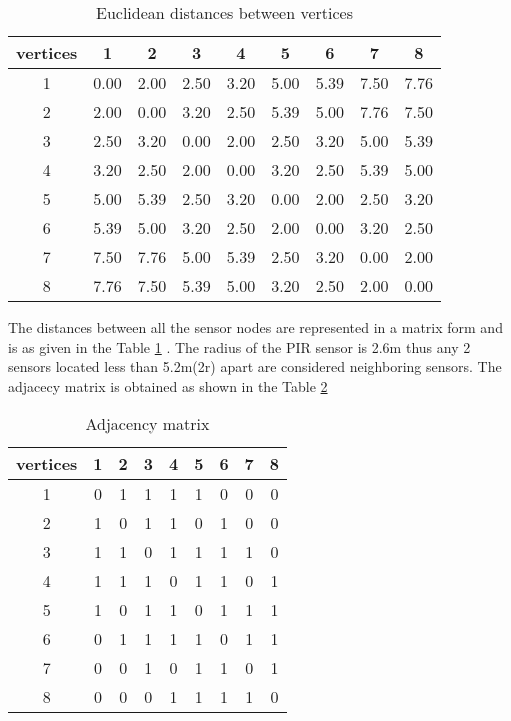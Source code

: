 \begin{table}[]
\centering
\caption{Euclidean distances between vertices}
\label{tab:dist}
\begin{tabular}{|c|c|c|c|c|c|c|c|c|}
\hline
vertices & 1    & 2    & 3    & 4    & 5    & 6    & 7    & 8    \\ \hline
1        & 0.00 & 2.00 & 2.50 & 3.20 & 5.00 & 5.39 & 7.50 & 7.76 \\ \hline
2        & 2.00 & 0.00 & 3.20 & 2.50 & 5.39 & 5.00 & 7.76 & 7.50 \\ \hline
3        & 2.50 & 3.20 & 0.00 & 2.00 & 2.50 & 3.20 & 5.00 & 5.39 \\ \hline
4        & 3.20 & 2.50 & 2.00 & 0.00 & 3.20 & 2.50 & 5.39 & 5.00 \\ \hline
5        & 5.00 & 5.39 & 2.50 & 3.20 & 0.00 & 2.00 & 2.50 & 3.20 \\ \hline
6        & 5.39 & 5.00 & 3.20 & 2.50 & 2.00 & 0.00 & 3.20 & 2.50 \\ \hline
7        & 7.50 & 7.76 & 5.00 & 5.39 & 2.50 & 3.20 & 0.00 & 2.00 \\ \hline
8        & 7.76 & 7.50 & 5.39 & 5.00 & 3.20 & 2.50 & 2.00 & 0.00 \\ \hline
\end{tabular}
\end{table}

The distances between all the sensor nodes are represented in a matrix form and is as given in the Table \ref{tab:dist} . The radius of the PIR sensor is 2.6m thus any 2 sensors located less than 5.2m(2r) apart are considered neighboring sensors. The adjacecy matrix is obtained as shown in the Table \ref{tab:am}

\begin{table}[]
\centering
\caption{Adjacency matrix}
\label{tab:am}
\begin{tabular}{|c|c|c|c|c|c|c|c|c|}
\hline
vertices & 1 & 2 & 3 & 4 & 5 & 6 & 7 & 8 \\ \hline
1        & 0 & 1 & 1 & 1 & 1 & 0 & 0 & 0 \\ \hline
2        & 1 & 0 & 1 & 1 & 0 & 1 & 0 & 0 \\ \hline
3        & 1 & 1 & 0 & 1 & 1 & 1 & 1 & 0 \\ \hline
4        & 1 & 1 & 1 & 0 & 1 & 1 & 0 & 1 \\ \hline
5        & 1 & 0 & 1 & 1 & 0 & 1 & 1 & 1 \\ \hline
6        & 0 & 1 & 1 & 1 & 1 & 0 & 1 & 1 \\ \hline
7        & 0 & 0 & 1 & 0 & 1 & 1 & 0 & 1 \\ \hline
8        & 0 & 0 & 0 & 1 & 1 & 1 & 1 & 0 \\ \hline
\end{tabular}
\end{table}

